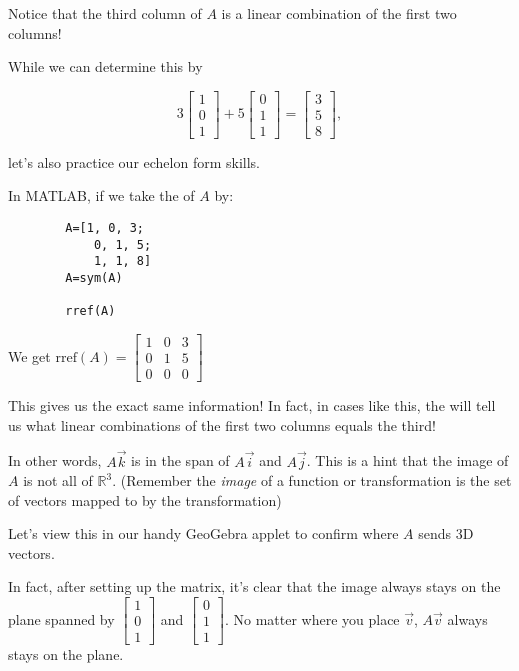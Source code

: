 \documentclass{ximera}
\begin{document}
\begin{remark}

    Notice that the third column of $A$ is a linear combination of the first two columns!

    While we can determine this by 
    
    \[3\begin{bmatrix}1\\0\\1\end{bmatrix}+5\begin{bmatrix}0\\1\\1\end{bmatrix}=\begin{bmatrix}3\\5\\8\end{bmatrix},\]

    let's also practice our echelon form skills. 

    In MATLAB, if we take the \rref of $A$ by:

    \begin{verbatim}
        A=[1, 0, 3;
            0, 1, 5;
            1, 1, 8]
        A=sym(A)

        rref(A)
    \end{verbatim}

    We get $\text{rref}(A)=\begin{bmatrix}1&0&3\\0&1&5\\0&0&0\end{bmatrix}$

    This gives us the exact same information! In fact, in cases like this, the \rref will tell us what linear combinations of the first two columns equals the third!
    
    In other words, $A\vec{k}$ is in the span of $A\vec{i}$ and $A\vec{j}$. This is a hint that the image of $A$ is not all of $\mathbb{R}^3$. (Remember the \emph{image} of a function or transformation is the set of vectors mapped to by the transformation)

    Let's view this in our handy GeoGebra applet to confirm where $A$ sends 3D vectors.

    \begin{center}
    

    \end{center}

    In fact, after setting up the matrix, it's clear that the image always stays on the plane spanned by $\begin{bmatrix}1\\0\\1\end{bmatrix}$ and $\begin{bmatrix}0\\1\\1\end{bmatrix}$. No matter where you place $\vec{v}$, $A\vec{v}$ always stays on the plane. 

\end{remark}
\end{document}

